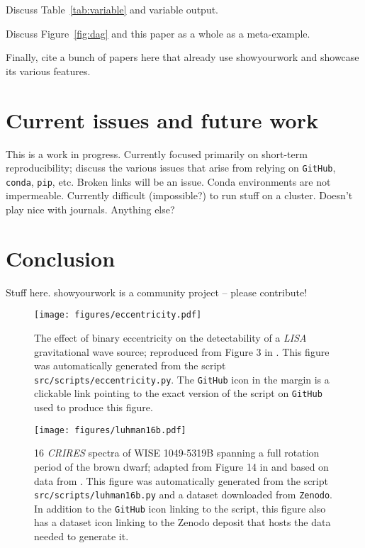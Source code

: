 \documentclass{aastex631}
\newcommand\xxx[1]{{\color{red}#1}}
\begin{document}
\xxx{Discuss Table~\ref{tab:variable} and variable output.}

\xxx{Discuss Figure~\ref{fig:dag} and this paper as a whole as a meta-example.}

\xxx{Finally, cite a bunch of papers here that already use showyourwork and showcase its various features.}

\section{Current issues and future work}
\label{sec:future}
\xxx{This is a work in progress. Currently focused primarily on short-term reproducibility; discuss the various issues that arise from relying on \texttt{GitHub}, \texttt{conda}, \texttt{pip}, etc. Broken links will be an issue. Conda environments are not impermeable. Currently difficult (impossible?) to run stuff on a cluster. Doesn't play nice with journals. Anything  else?}

\section{Conclusion}
\label{sec:conclusion}
\xxx{Stuff here. showyourwork is a community project -- please contribute!}

\clearpage

\begin{figure}[p!]
    \begin{centering}
        \texttt{[image: figures/eccentricity.pdf]}
        \caption{
            The effect of binary eccentricity on the detectability of a \emph{LISA} gravitational wave source; reproduced from Figure 3 in \citet{Wagg2022}. 
            This figure was automatically generated from the script \texttt{src/scripts/eccentricity.py}.
            The \texttt{GitHub} icon in the margin is a clickable link pointing to the exact version of the script on \texttt{GitHub} used to produce this figure.
        }
        \label{fig:eccentricity}
    \end{centering}
\end{figure}

\begin{figure}[p!]
    \begin{centering}
        \texttt{[image: figures/luhman16b.pdf]}
        \caption{
            16 \emph{CRIRES} spectra of WISE 1049-5319B spanning a full rotation period of the brown dwarf; adapted from Figure 14 in \citet{Luger2021c} and based on data from \citet{Crossfield2014}.
            This figure was automatically generated from the script \texttt{src/scripts/luhman16b.py} and a dataset downloaded from \texttt{Zenodo}.
            In addition to the \texttt{GitHub} icon linking to the script, this figure also has a dataset icon linking to the Zenodo deposit that hosts the data needed to generate it.
        }
        \label{fig:luhman16b}
    \end{centering}
\end{figure}
\end{document}
